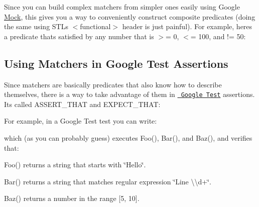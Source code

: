 Since you can build complex matchers from simpler ones easily using Google \mbox{\hyperlink{class_mock}{Mock}}, this gives you a way to conveniently construct composite predicates (doing the same using S\+TL\textquotesingle{}s {\ttfamily $<$functional$>$} header is just painful). For example, here\textquotesingle{}s a predicate that\textquotesingle{}s satisfied by any number that is $>$= 0, $<$= 100, and != 50\+:


\begin{DoxyCode}{0}
\end{DoxyCode}


\subsection*{Using Matchers in Google Test Assertions}

Since matchers are basically predicates that also know how to describe themselves, there is a way to take advantage of them in \href{http://code.google.com/p/googletest/}\texttt{ Google Test} assertions. It\textquotesingle{}s called {\ttfamily A\+S\+S\+E\+R\+T\+\_\+\+T\+H\+AT} and {\ttfamily E\+X\+P\+E\+C\+T\+\_\+\+T\+H\+AT}\+:


\begin{DoxyCode}{0}
\end{DoxyCode}


For example, in a Google Test test you can write\+:


\begin{DoxyCode}{0}
\DoxyCodeLine{}
\DoxyCodeLine{}
\end{DoxyCode}


which (as you can probably guess) executes {\ttfamily Foo()}, {\ttfamily Bar()}, and {\ttfamily Baz()}, and verifies that\+:


\begin{DoxyItemize}
\item {\ttfamily Foo()} returns a string that starts with {\ttfamily \char`\"{}\+Hello\char`\"{}}.
\item {\ttfamily Bar()} returns a string that matches regular expression {\ttfamily \char`\"{}\+Line \textbackslash{}\textbackslash{}d+\char`\"{}}.
\item {\ttfamily Baz()} returns a number in the range \mbox{[}5, 10\mbox{]}.
\end{DoxyItemize}

